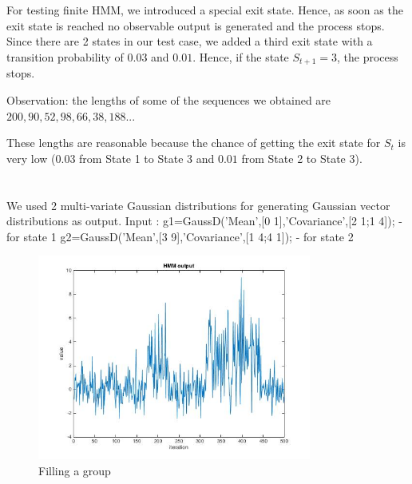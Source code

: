 \section{} %
For testing finite HMM, we introduced a special exit state. Hence, as soon as the exit state is reached no observable output is generated and the process stops. Since there are 2 states in our test case, we added a third exit state with a transition probability of $0.03$ and $0.01$. Hence, if the state $S_{t+1} = 3$, the process stops.

Observation: the lengths of some of the sequences we obtained are $200, 90, 52, 98, 66, 38, 188$...

These lengths are reasonable because the chance of getting the exit state for $S_t$ is very low ($0.03$ from State 1 to State 3 and $0.01$ from State 2 to State 3).

\section{} %
We used 2 multi-variate Gaussian distributions for generating Gaussian vector distributions as output.
Input :
g1=GaussD('Mean',[0 1],'Covariance',[2 1;1 4]); - for state 1 g2=GaussD('Mean',[3 9],'Covariance',[1 4;4 1]); - for state 2

\begin{figure}[H]
	\caption{Filling a group}
	\label{fig:question_4_HMM_plot}
	\centering
	\includegraphics[width=9cm]{images/question_4_HMM_plot}
\end{figure}